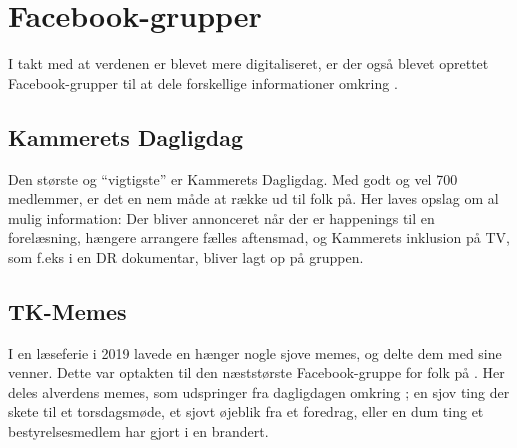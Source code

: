 \section{Facebook-grupper}
I takt med at verdenen er blevet mere digitaliseret, er der også blevet oprettet Facebook-grupper til at dele forskellige informationer omkring \TKET.

\subsection{Kammerets Dagligdag}
Den største og ``vigtigste'' er Kammerets Dagligdag. Med godt og vel 700 medlemmer, er det en nem måde at række ud til folk på. Her laves opslag om al mulig information: Der bliver annonceret når der er happenings til en forelæsning, hængere arrangere fælles aftensmad, og Kammerets inklusion på TV, som f.eks i en DR dokumentar, bliver lagt op på gruppen.

\subsection{TK-Memes}
I en læseferie i 2019 lavede en hænger nogle sjove memes, og delte dem med sine venner. Dette var optakten til den næststørste Facebook-gruppe for folk på \TKET{}. Her deles alverdens memes, som udspringer fra dagligdagen omkring \TKET{}; en sjov ting der skete til et torsdagsmøde, et sjovt øjeblik fra et foredrag, eller en dum ting et bestyrelsesmedlem har gjort i en brandert.

\vfill
{}
\vfill